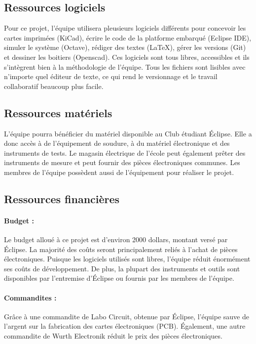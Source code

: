 	\subsection{Ressources logiciels}
	Pour ce projet, l'équipe utilisera pleusieurs logiciels différents pour concevoir les cartes imprimées (KiCad), écrire le code de la platforme embarqué (Eclipse IDE), simuler le système (Octave), rédiger des textes (LaTeX), gérer les versions (Git) et dessiner les boitiers (Openscad). Ces logiciels sont tous libres, accessibles et ils s'intègrent bien à la méthodologie de l'équipe. Tous les fichiers sont lisibles avec n'importe quel éditeur de texte, ce qui rend le versionnage et le travail collaboratif beaucoup plus facile.

	
	\subsection{Ressources matériels}
	L'équipe pourra bénéficier du matériel disponible au Club étudiant Éclipse. Elle a donc accès à de l'équipement de soudure, à du matériel électronique et des instruments de tests. Le magasin électrique de l'école peut également prêter des instruments de mesure et peut fournir des pièces électroniques communes. Les membres de l'équipe possèdent aussi de l'équipement pour réaliser le projet.


	\subsection{Ressources financières}

		\paragraph{Budget :}
		Le budget alloué à ce projet est d'environ 2000 dollars, montant versé par Éclipse. La majorité des coûts seront principalement reliés à l'achat de pièces électroniques. Puisque les logiciels utilisés sont libres, l'équipe réduit énormément ses coûts de développement. De plus, la plupart des instruments et outils sont disponibles par l'entremise d'Éclipse ou fournis par les membres de l'équipe.
		
		\paragraph{Commandites :}
 		Grâce à une commandite de Labo Circuit, obtenue par Éclipse, l'équipe sauve de l'argent sur la fabrication des cartes électroniques (PCB). Également, une autre commandite de Wurth Electronik réduit le prix des pièces électroniques.